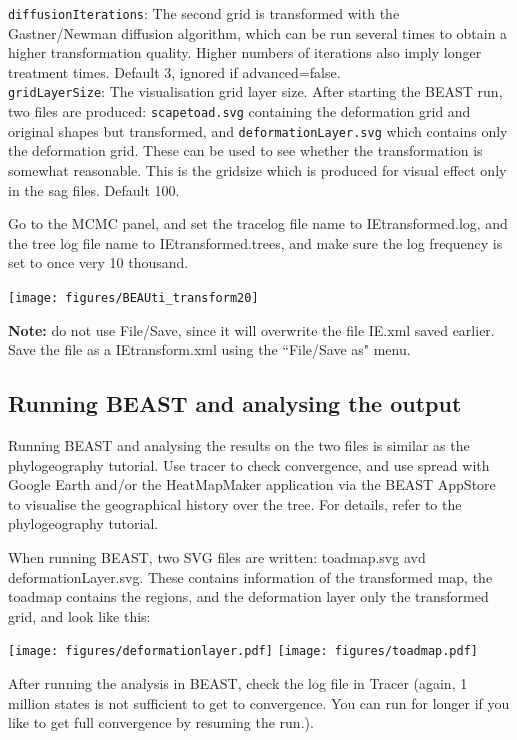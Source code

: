 \documentclass{article}
\begin{document}
{\tt diffusionIterations}: The second grid is transformed with the Gastner/Newman diffusion 
algorithm, which can be run several times to obtain a higher transformation quality. 
Higher numbers of iterations also imply longer treatment times.
Default 3, ignored if advanced=false.\\

{\tt gridLayerSize}: The visualisation grid layer size. After starting the BEAST run, two files are produced:
{\tt scapetoad.svg} containing the deformation grid and original shapes but transformed, and 
{\tt deformationLayer.svg} which contains only the deformation grid. These can be used to see whether the transformation is somewhat reasonable. This is the gridsize which is produced for visual effect only in the sag files. 
Default 100.


Go to the MCMC panel, and set the tracelog file name to IEtransformed.log, and the tree log file name to IEtransformed.trees, and make sure the log frequency is set to once very 10 thousand.
\begin{center}
\texttt{[image: figures/BEAUti\_transform20]}
\end{center}

{\bf Note:} do not use File/Save, since it will overwrite the file IE.xml saved earlier. Save the file as a IEtransform.xml using the ``File/Save as" menu.

\subsection*{Running BEAST and analysing the output}

Running BEAST and analysing the results on the two files is similar as the phylogeography tutorial. Use tracer to check convergence, and use spread with Google Earth and/or the HeatMapMaker application via the BEAST AppStore to visualise the geographical history over the tree. For details, refer to the phylogeography tutorial.

When running BEAST, two SVG files are written: toadmap.svg avd deformationLayer.svg. These contains information of the transformed map, the toadmap contains the regions, and the deformation layer only the transformed grid, and look like this:

\texttt{[image: figures/deformationlayer.pdf]}
\texttt{[image: figures/toadmap.pdf]}

After running the analysis in BEAST, check the log file in Tracer (again, 1 million states is not sufficient to get to convergence. You can run for longer if you like to get full convergence by resuming the run.).
\end{document}
